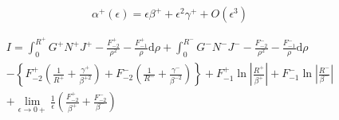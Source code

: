 \documentclass[a4paper,11pt]{article}
\newcommand{\td}{\mathrm{d}}
\begin{document}
\begin{equation}
\alpha^+(\epsilon) =  \epsilon \beta^+ + \epsilon^2 \gamma^+ + O(\epsilon^3)
\end{equation}

\begin{multline}
I =
\int_{0}^{R^+} G^+ N^+ J^+ - \frac{F_{-2}^+}{\rho^2} - \frac{F_{-1}^+}{\rho} \td \rho +
\int_{0}^{R^-} G^- N^- J^- - \frac{F_{-2}^-}{\rho^2} - \frac{F_{-1}^-}{\rho} \td \rho \\
-
\left\{
F_{-2}^+\left(\frac{1}{R^+} + \frac{\gamma^+}{\beta^{+2}}\right)
+
F_{-2}^-\left(\frac{1}{R^-} + \frac{\gamma^-}{\beta^{-2}}\right)
\right\}
+ F_{-1}^+ \ln \left|\frac{R^+}{\beta^+}\right|
+ F_{-1}^- \ln \left|\frac{R^-}{\beta^-}\right| \\
+
\lim_{\epsilon \to 0+}
\frac{1}{\epsilon}
\left(
\frac{F_{-2}^+}{\beta^+}
+ \frac{F_{-2}^-}{\beta^-}
\right)
\end{multline}
\end{document}
